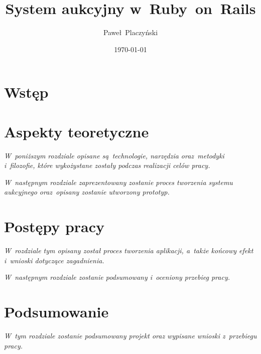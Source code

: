 \documentclass[oneside]{book}
\author{Paweł~Placzyński}
\title{System aukcyjny w~Ruby~on~Rails}
\date{\today}
\begin{document}

\tableofcontents

\chapter{Wstęp}



\chapter{Aspekty teoretyczne}

\textit{W~poniższym rozdziale opisane są~technologie, narzędzia oraz~metodyki i~filozofie, które wykożystane zostały podczas realizacji celów pracy.}









\textit{W~następnym rozdziale zaprezentowany zostanie proces tworzenia systemu aukcyjnego oraz~opisany zostanie utworzony prototyp.}

\chapter{Postępy pracy}

\textit{W~rozdziale tym opisany został proces tworzenia aplikacji, a~także końcowy efekt i~wnioski dotyczące zagadnienia.}







\textit{W~następnym rozdziale zostanie podsumowany i~oceniony przebieg pracy.}

\chapter{Podsumowanie}

\textit{W~tym rozdziale zostanie podsumowany projekt oraz wypisane wnioski z~przebiegu pracy.}



\listoffigures


\end{document}
